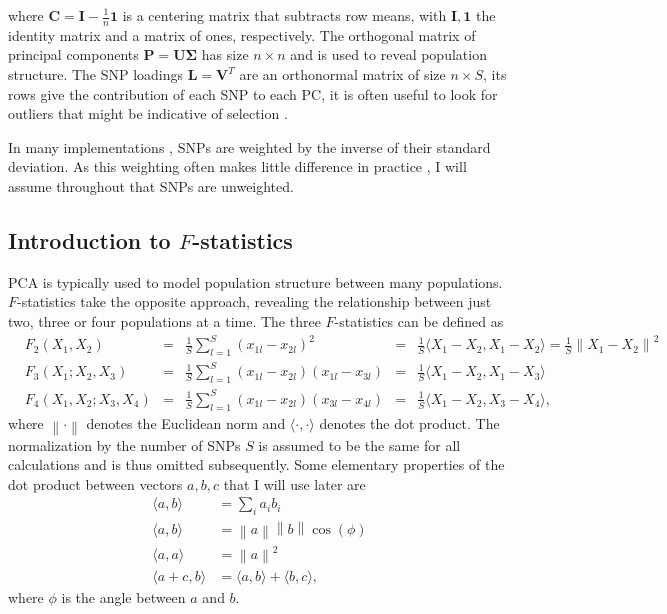\documentclass[12pt,fullpage, a4paper]{article}
\newcommand{\norm}[1]{\left\lVert#1\right\rVert}
\newcommand{\normsq}[1]{\left\lVert#1\right\rVert^2}
\newcommand{\MC}{\mathbf{C}} %
\newcommand{\MP}{\mathbf{P}} %
\newcommand{\ML}{\mathbf{L}} %
\newcommand{\MSINGULAR}{\mathbf{\Sigma}} %
\begin{document}
	where $\MC = \mathbf{I} -\frac{1}{n}\mathbf{1}$ is a centering matrix that subtracts row means, with $\mathbf{I}, \mathbf{1}$  the identity matrix and a matrix of ones, respectively. The orthogonal matrix of principal components $\MP=\mathbf{U}\MSINGULAR$ has size $n \times n$ and is used to reveal population structure. The SNP loadings $\ML=\mathbf{V}^T$ are an orthonormal matrix of size $n \times S$, its rows give the contribution of each SNP to each PC, it is often useful to look for outliers that might be indicative of selection \citep[e.g][]{francois2010}.
	
	In many  implementations \citep[e.g.][]{patterson2006}, SNPs are weighted by
    the inverse of their standard deviation. As this weighting often makes little
    difference in practice \citep{mcvean2009}, I will assume throughout that SNPs
    are unweighted.

\subsection{Introduction to $F$-statistics}
PCA is typically used to model population structure between many populations. $F$-statistics take the opposite approach, revealing the relationship between just two,  three or four populations at a time. The three $F$-statistics can be defined as 
\begin{subequations}
	\begin{align}
	&F_2(X_1, X_2) &=& \frac{1}{S}\sum_{l=1}^S(x_{1l} - x_{2l})^2
	&=& \frac{1}{S}\langle X_1 - X_2, X_1 - X_2 \rangle = \frac{1}{S}\normsq{X_1-  X_2}\\
	&F_3(X_1; X_2, X_3) &=& \frac{1}{S}\sum_{l=1}^S(x_{1l} - x_{2l})(x_{1l} - x_{3l}) &=& \frac{1}{S}\langle X_1 - X_2, X_1 - X_3 \rangle\\	
	&F_4(X_1, X_2; X_3, X_4) &=& \frac{1}{S}\sum_{l=1}^S(x_{1l} - x_{2l})(x_{3l} - x_{4l}) &=& \frac{1}{S}\langle X_1 - X_2, X_3 - X_4 \rangle	\text{,}
	\end{align}
\end{subequations}
where $\norm{\cdot}$ denotes the Euclidean norm and $\langle \cdot, \cdot \rangle$ denotes the dot product. The normalization by the number of SNPs $S$ is assumed to be the same for all calculations and is thus omitted subsequently. Some elementary properties of the dot product between vectors $a, b, c$ that I will use later are
\begin{subequations}
\begin{align}
\langle a, b \rangle &= \sum_i a_ib_i\\
\langle a, b \rangle &= \norm{a}\norm{b}\cos(\phi)\\
\langle a, a \rangle &= \normsq{a}\\
\langle a + c, b \rangle &= \langle a, b \rangle + \langle b, c \rangle,
\end{align}
\end{subequations}
where $\phi$ is the angle between $a$ and $b$. 
\end{document}
